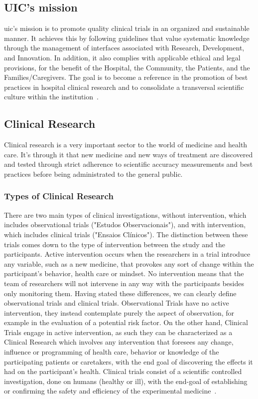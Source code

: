 \subsection{UIC's mission}
\acrshort{uic}'s mission is to promote quality clinical trials in an organized and sustainable manner. It achieves this by following guidelines that value systematic knowledge through the management of interfaces associated with Research, Development, and Innovation. In addition, it also complies with applicable ethical and legal provisions, for the benefit of the Hospital, the Community, the Patients, and the Families/Caregivers.
The goal is to become a reference in the promotion of best practices in hospital clinical research and to consolidate a transversal scientific culture within the institution~\cite{hff-uic}.

\subsection{Clinical Research}
Clinical research is a very important sector to the world of medicine and
health care. It's through it that new medicine and new ways of
treatment are discovered and tested through strict adherence to 
scientific accuracy measurements and best practices before being
administrated to the general public. 

\subsubsection{Types of Clinical Research}
There are two main types of clinical investigations, without intervention, which includes observational trials ("Estudos Observacionais"), and with intervention, which includes clinical trials ("Ensaios Clínicos"). The distinction between these trials comes down to the type of intervention between the study and the participants. Active intervention occurs when the researchers in a trial introduce any variable, such as a new medicine, that provokes any sort of change within the participant's behavior, health care or mindset. No intervention means that the team of researchers will not intervene in any way with the participants besides only monitoring them.
Having stated these differences, we can clearly define observational trials and clinical trials.
Observational Trials have no active intervention, they instead contemplate purely the aspect of observation, for example in the evaluation of a potential risk factor. On the other hand, Clinical Trials engage in active intervention, as such they can be characterized as a Clinical Research which involves any intervention that foresees any change, influence or programming of health care, behavior or knowledge of the participating patients or caretakers, with the end goal of discovering the effects it had on the participant's health.
Clinical trials consist of a scientific controlled investigation, done
on humans (healthy or ill), with the end-goal of establishing or confirming the safety and efficiency of the experimental medicine~\cite{tipos-de-ensaios}.  

